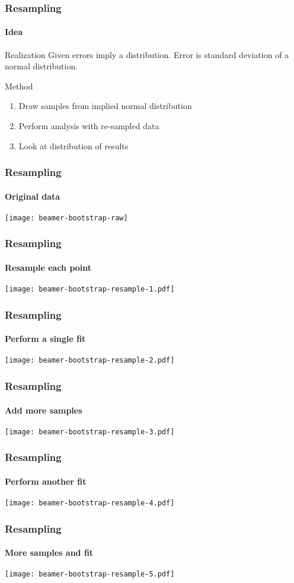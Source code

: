 \documentclass[english, fleqn]{beamer}
\begin{document}
\begin{frame}
    \frametitle{Resampling}
    \framesubtitle{Idea}

    \begin{block}{Realization}
            Given errors imply a distribution. Error is standard deviation of a
            normal distribution.
    \end{block}

    \pause

    \begin{block}{Method}
        \begin{enumerate}
            \item Draw samples from implied normal distribution
            \item Perform analysis with re-sampled data
            \item Look at distribution of results
        \end{enumerate}
    \end{block}
\end{frame}

\begin{frame}
    \frametitle{Resampling}
    \framesubtitle{Original data}
    \centering
    \texttt{[image: beamer-bootstrap-raw]}
\end{frame}

\begin{frame}
    \frametitle{Resampling}
    \framesubtitle{Resample each point}
    \centering
    \texttt{[image: beamer-bootstrap-resample-1.pdf]}
\end{frame}

\begin{frame}
    \frametitle{Resampling}
    \framesubtitle{Perform a single fit}
    \centering
    \texttt{[image: beamer-bootstrap-resample-2.pdf]}
\end{frame}

\begin{frame}
    \frametitle{Resampling}
    \framesubtitle{Add more samples}
    \centering
    \texttt{[image: beamer-bootstrap-resample-3.pdf]}
\end{frame}

\begin{frame}
    \frametitle{Resampling}
    \framesubtitle{Perform another fit}
    \centering
    \texttt{[image: beamer-bootstrap-resample-4.pdf]}
\end{frame}

\begin{frame}
    \frametitle{Resampling}
    \framesubtitle{More samples and fit}
    \centering
    \texttt{[image: beamer-bootstrap-resample-5.pdf]}
\end{frame}
\end{document}
